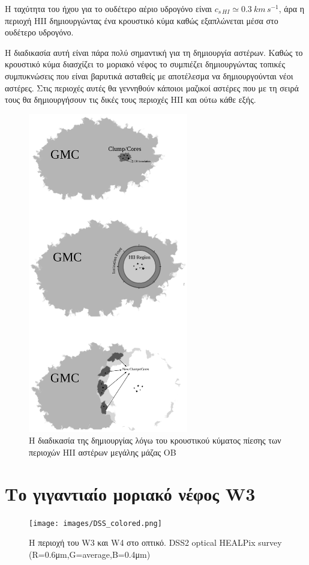 \documentclass[a4paper,12pt]{memoir}
\begin{document}
Η ταχύτητα του ήχου για το ουδέτερο αέριο υδρογόνο είναι $c_{s \, HI}\simeq 0.3 \ km \, s^{-1}$, άρα η περιοχή HII δημιουργώντας ένα κρουστικό κύμα καθώς εξαπλώνεται μέσα στο ουδέτερο υδρογόνο. 

Η διαδικασία αυτή είναι πάρα πολύ σημαντική για τη δημιουργία αστέρων. Καθώς το κρουστικό κύμα διασχίζει το μοριακό νέφος το συμπιέζει δημιουργώντας τοπικές συμπυκνώσεις που είναι βαρυτικά ασταθείς με αποτέλεσμα να δημιουργούνται νέοι αστέρες. Στις περιοχές αυτές θα γεννηθούν κάποιοι μαζικοί αστέρες που με τη σειρά τους θα δημιουργήσουν τις δικές τους περιοχές HII και ούτω κάθε εξής.


\begin{figure}[h!]
	\centering
	\includegraphics[height=14cm]{images/induced.ps}
	\caption{Η διαδικασία της δημιουργίας λόγω του κρουστικού κύματος πίεσης των περιοχών HII αστέρων μεγάλης μάζας OB}
\end{figure}


\chapter{Το γιγαντιαίο μοριακό νέφος W3}

\begin{figure}[h!]
	\centering
	\texttt{[image: images/DSS\_colored.png]}
	\caption{Η περιοχή του W3 και W4 στο οπτικό. DSS2 optical HEALPix survey (R=0.6μm,G=average,B=0.4μm)}
\end{figure}
\end{document}
